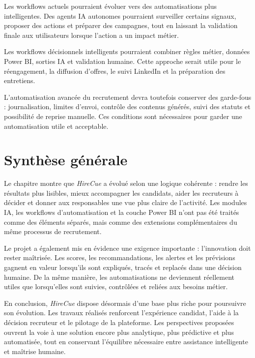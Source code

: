 Les workflows actuels pourraient évoluer vers des automatisations plus intelligentes. Des agents IA autonomes pourraient surveiller certains signaux, proposer des actions et préparer des campagnes, tout en laissant la validation finale aux utilisateurs lorsque l'action a un impact métier.

Les workflows décisionnels intelligents pourraient combiner règles métier, données Power BI, sorties IA et validation humaine. Cette approche serait utile pour le réengagement, la diffusion d'offres, le suivi LinkedIn et la préparation des entretiens.

L'automatisation avancée du recrutement devra toutefois conserver des garde-fous : journalisation, limites d'envoi, contrôle des contenus générés, suivi des statuts et possibilité de reprise manuelle. Ces conditions sont nécessaires pour garder une automatisation utile et acceptable.

\section{Synthèse générale}

Le chapitre montre que \textit{HireCue} a évolué selon une logique cohérente : rendre les résultats plus lisibles, mieux accompagner les candidats, aider les recruteurs à décider et donner aux responsables une vue plus claire de l'activité. Les modules IA, les workflows d'automatisation et la couche Power BI n'ont pas été traités comme des éléments séparés, mais comme des extensions complémentaires du même processus de recrutement.

Le projet a également mis en évidence une exigence importante : l'innovation doit rester maîtrisée. Les scores, les recommandations, les alertes et les prévisions gagnent en valeur lorsqu'ils sont expliqués, tracés et replacés dans une décision humaine. De la même manière, les automatisations ne deviennent réellement utiles que lorsqu'elles sont suivies, contrôlées et reliées aux besoins métier.

En conclusion, \textit{HireCue} dispose désormais d'une base plus riche pour poursuivre son évolution. Les travaux réalisés renforcent l'expérience candidat, l'aide à la décision recruteur et le pilotage de la plateforme. Les perspectives proposées ouvrent la voie à une solution encore plus analytique, plus prédictive et plus automatisée, tout en conservant l'équilibre nécessaire entre assistance intelligente et maîtrise humaine.
